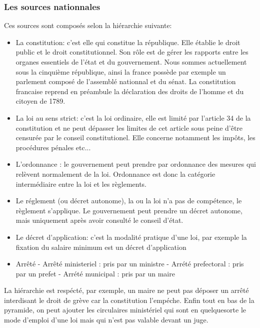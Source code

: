 \documentclass[a4paper]{article}
\begin{document}
				\subsubsection{Les sources nationnales}
					Ces sources sont composés selon la hiérarchie suivante:
					\begin{itemize}
						\item La constitution: c'est elle qui constitue la république. Elle établie le droit public et le droit constitutionnel. Son rôle est de gérer les rapports entre les organes essentiels de l'état et du gouvernement. Nous sommes actuellement sous la cinquième république, ainsi la france possède par exemple un parlement composé de l'assemblé nationnal et du sénat. La constitution francaise reprend en préambule la déclaration des droits de l'homme et du citoyen de 1789. 
						\item La loi au sens strict: c'est la loi ordinaire, elle est limité par l'article 34 de la constitution et ne peut dépasser les limites de cet article sous peine d'être censurée par le conseil constitutionel. Elle concerne notamment les impôts, les procédures pénales etc...
						\item L'ordonnance : le gouvernement peut prendre par ordonnance des mesures qui relèvent normalement de la loi.
						Ordonnance est donc la catégorie intermédiaire entre la loi et les règlements.
						\item Le réglement (ou décret autonome), la ou la loi n'a pas de compétence, le règlement s'applique. Le gouvernement peut prendre un décret autonome, mais uniquement après avoir consulté le conseil d'état.
						\item Le décret d'application: c'est la modalité pratique d'une loi, par exemple la fixation du salaire minimum est un décret d'application
						\item Arrêté 
							\subitem - Arrêté ministeriel : pris par un ministre
							\subitem - Arrété prefectoral : pris par un prefet
							\subitem - Arrété municipal : pris par un maire
					\end{itemize}
				
					La hiérarchie est respécté, par exemple, un maire ne peut pas déposer un arrêté interdisant le droit de grève car la constitution l'empéche. Enfin tout en bas de la pyramide, on peut ajouter les circulaires ministériel qui sont en quelquesorte le mode d'emploi d'une loi mais qui n'est pas valable devant un juge. 
\end{document}

